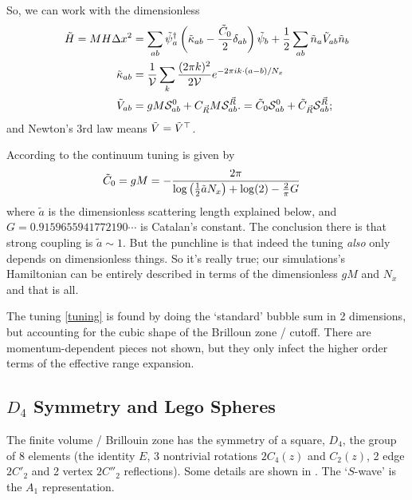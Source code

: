 So, we can work with the dimensionless
\begin{align}
	\tilde{H} = MH\Delta x^2 &= 
		\sum_{ab} \tilde{\psi}{}^{\dagger}_a \left(
			\tilde{\kappa}_{ab}
			- \frac{\tilde{C}_0}{2} \delta_{ab}
			\right) \tilde{\psi}_b
		+ \frac{1}{2} \sum_{ab} \tilde{n}_a \tilde{V}_{ab} \tilde{n}_b
\label{eq:dimensionless hamiltonian}
\\
	\tilde{\kappa}_{ab} &=
				\frac{1}{\mathcal{V}} \sum_{k} \frac{(2\pi k)^2}{2 \mathcal{V}} e^{-2\pi i k \cdot(a-b)/N_x} 
\\
	\tilde{V}_{ab} &= 
				gM \mathcal{S}^{0}_{ab}
				+ C_{\vec{R}} M \mathcal{S}^{\vec{R}}_{ab}.
				=
				\tilde{C}_0 \mathcal{S}^{0}_{ab}
				+ \tilde{C}_{\vec{R}} \mathcal{S}^{\vec{R}}_{ab};
\label{eq:dimensionless potential}
\end{align}
and Newton's 3rd law means $\tilde{V}=\tilde{V}{}^{\top}$.

According to  the continuum tuning is given by
\begin{align}
	\tilde{C}_0 = gM &= - \frac{2\pi}{\log\left(\frac{1}{2}\tilde{a} N_x\right) + \log(2) - \frac{2}{\pi}G}
	\label{eq:tuning}
\end{align}
where $\tilde{a}$ is the dimensionless scattering length explained below, and $G=0.9159655941772190\cdots$ is Catalan's constant.
The conclusion there is that strong coupling is $\tilde{a}\sim 1$.
But the punchline is that indeed the tuning \emph{also} only depends on dimensionless things.
So it's really true; our simulations's Hamiltonian can be entirely described in terms of the dimensionless $gM$ and $N_x$ and that is all.

The tuning \eqref{tuning} is found by doing the `standard' bubble sum in 2 dimensions, but accounting for the cubic shape of the Brilloun zone / cutoff.
There are momentum-dependent pieces not shown, but they only infect the higher order terms of the effective range expansion.

\subsection{$D_4$ Symmetry and Lego Spheres}

The finite volume / Brillouin zone has the symmetry of a square, $D_4$, the group of 8 elements (the identity $E$, 3 nontrivial rotations $2C_4(z)$ and $C_2(z)$, 2 edge $2C'_2$ and 2 vertex $2C''_2$ reflections).
Some details are shown in .
The `$S$-wave' is the $A_1$ representation.

